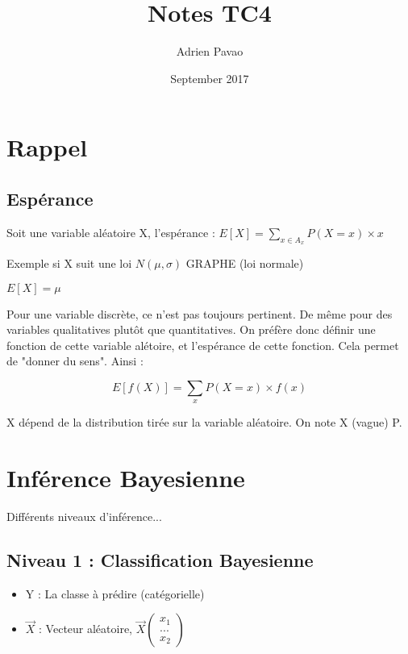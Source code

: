 \documentclass{article}
\title{Notes TC4}
\author{Adrien Pavao}
\date{September 2017}
\begin{document}
\maketitle

\tableofcontents

\section{Rappel}

\subsection{Espérance}

Soit une variable aléatoire X, l'espérance : $E[X] = \sum_{x \in A_x} P(X = x) \times x$

Exemple si X suit une loi $N(\mu, \sigma)$ GRAPHE (loi normale)

$E[X] = \mu$

Pour une variable discrète, ce n'est pas toujours pertinent. De même pour des variables qualitatives plutôt que quantitatives. On préfère donc définir une fonction de cette variable alétoire, et l'espérance de cette fonction. Cela permet de "donner du sens". Ainsi :

\[ E[f(X)] = \sum_x P(X = x) \times f(x) \]

X dépend de la distribution tirée sur la variable aléatoire. On note X (vague) P.

\section{Inférence Bayesienne}

Différents niveaux d'inférence...

\subsection{Niveau 1 : Classification Bayesienne}

\begin{itemize}
\item Y : La classe à prédire (catégorielle)
\item $\vec{X}$ : Vecteur aléatoire, \( \vec{X} 
\begin{pmatrix} 
      x_1\\ 
      ...\\
      x_2 
\end{pmatrix} \)

\end{itemize}
\end{document}
